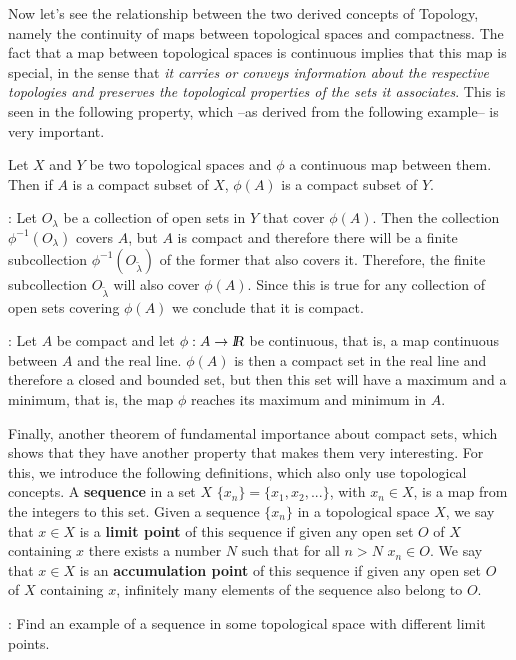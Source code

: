 Now let's see the relationship between the two derived concepts of
Topology, namely the continuity of maps between topological
spaces and compactness. The fact that a map between
topological spaces is continuous implies that this map is special,
in the sense that {\it it carries or conveys information about the respective
topologies and preserves the topological properties of the sets
it associates}. This is seen in the following property, which --as derived
from the following example-- is very important.

\bteo
Let $X$ and $Y$ be two topological spaces and $\phi$ a continuous
map between them. Then if $A$ is a compact subset of $X$, 
$\phi(A)$ is a compact subset of $Y$.
\eteo

\pru:
Let $O_{\lambda}$ be a collection of open sets in $Y$ that cover $\phi(A)$.
Then the collection $\phi^{-1}(O_{\lambda})$ covers $A$, but $A$ is
compact and therefore there will be a finite subcollection 
$\phi^{-1}(O_{\tilde{\lambda}})$
of the former that also covers it. Therefore, the finite subcollection
$O_{\tilde{\lambda}}$ will also cover $\phi(A)$. Since this is
true for any collection of open sets covering $\phi(A)$
we conclude that it is compact.

\ejem: Let $A$ be compact and let $\phi:A \to \mbox{\sl {l$\!\!\!\;\:\!$R}}$ be continuous, that is, a map 
continuous between $A$ and the real line. $\phi(A)$ is then a compact set
in the real line and therefore a closed and bounded set, but
then this set will have a maximum and a minimum, that is, the
map $\phi$ reaches its maximum and minimum in $A$.


Finally, another theorem of fundamental importance about compact sets,
which shows that they have another property that makes them
very interesting. For this, we introduce the following definitions,
which also only use topological concepts.
A {\bf sequence} in a set $X$ 
$\{x_n\} = \{x_1, x_2, ...\}$, with $x_n \in X$, is a map
from the integers to this set.
Given a sequence $\{x_n\}$ in a topological space $X$, we say that 
$x \in X$ is a {\bf limit point} of this sequence if given
any open set $O$ of $X$ containing $x$ there exists a number $N$
such that for all $n > N$ $x_n \in O$. We say that 
$x \in X$ is an {\bf accumulation point} of this sequence if given 
any open set $O$ of $X$ containing $x$, infinitely many elements of the
sequence also belong to $O$. 

\espa

\ejer: Find an example of a sequence in some topological
space with different limit points. 

